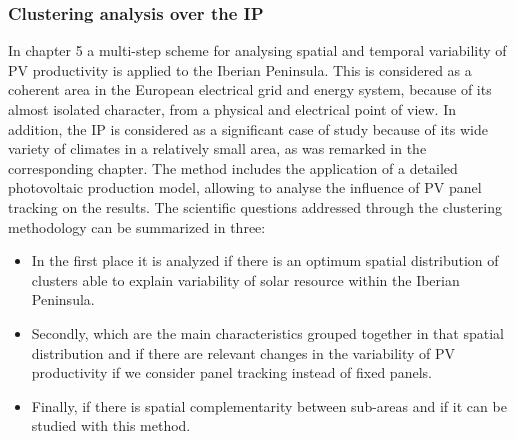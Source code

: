 

\subsubsection{Clustering analysis over the IP}

In chapter 5 a multi-step scheme for analysing spatial and temporal variability of PV productivity is applied to the Iberian Peninsula. This is considered as a coherent area in the European electrical grid and energy system, because of its almost isolated character, from a physical and electrical point of view. In addition, the IP is considered as a significant case of study because of its wide variety of climates in a relatively small area, as was remarked in the corresponding chapter. The method includes the application of a detailed photovoltaic production model, allowing to analyse the influence of PV panel tracking on the results. The scientific questions addressed through the clustering methodology can be summarized in three:

\begin{itemize}
  
\item In the first place it is analyzed if there is an optimum spatial distribution of clusters able to explain variability of solar resource within the Iberian Peninsula.

\item Secondly, which are the main characteristics grouped together in that spatial distribution and if there are relevant changes in the variability of PV productivity if we consider panel tracking instead of fixed panels.

\item Finally, if there is spatial complementarity between sub-areas and if it can be studied with this method.

\end{itemize}


